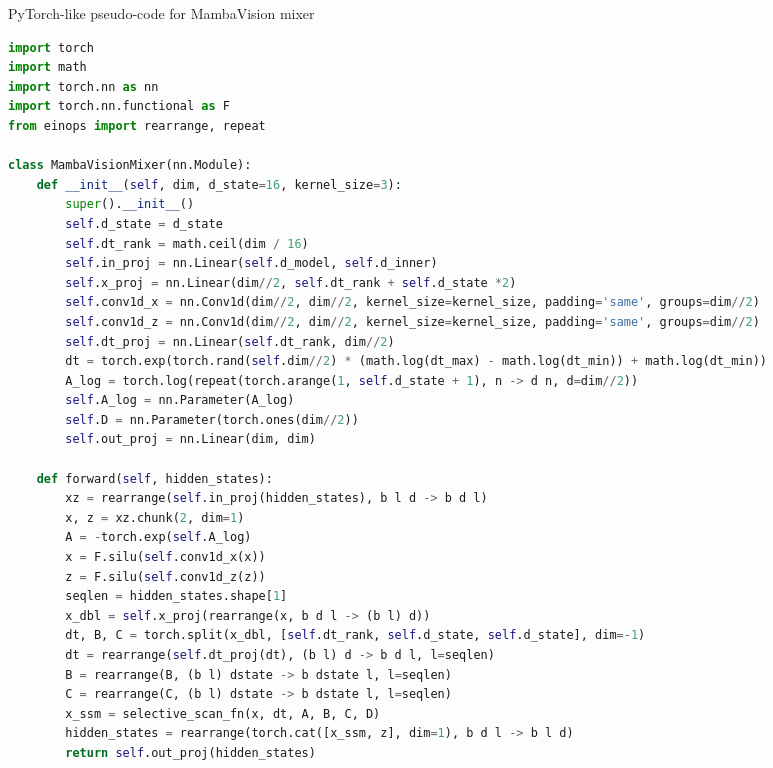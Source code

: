 \documentclass[10pt,twocolumn,letterpaper]{article}
\begin{document}
\begin{algorithm*}[t]
\caption{PyTorch-like pseudo-code for MambaVision mixer}
\label{alg:mamba_vision_mixer}
\begin{lstlisting}[language=python]
import torch
import math
import torch.nn as nn
import torch.nn.functional as F
from einops import rearrange, repeat

class MambaVisionMixer(nn.Module):
    def __init__(self, dim, d_state=16, kernel_size=3):
        super().__init__()
        self.d_state = d_state
        self.dt_rank = math.ceil(dim / 16)
        self.in_proj = nn.Linear(self.d_model, self.d_inner)
        self.x_proj = nn.Linear(dim//2, self.dt_rank + self.d_state *2)
        self.conv1d_x = nn.Conv1d(dim//2, dim//2, kernel_size=kernel_size, padding='same', groups=dim//2)
        self.conv1d_z = nn.Conv1d(dim//2, dim//2, kernel_size=kernel_size, padding='same', groups=dim//2)
        self.dt_proj = nn.Linear(self.dt_rank, dim//2)
        dt = torch.exp(torch.rand(self.dim//2) * (math.log(dt_max) - math.log(dt_min)) + math.log(dt_min))
        A_log = torch.log(repeat(torch.arange(1, self.d_state + 1), n -> d n, d=dim//2))
        self.A_log = nn.Parameter(A_log)
        self.D = nn.Parameter(torch.ones(dim//2))
        self.out_proj = nn.Linear(dim, dim)

    def forward(self, hidden_states):
        xz = rearrange(self.in_proj(hidden_states), b l d -> b d l)
        x, z = xz.chunk(2, dim=1)
        A = -torch.exp(self.A_log)
        x = F.silu(self.conv1d_x(x))
        z = F.silu(self.conv1d_z(z))
        seqlen = hidden_states.shape[1]
        x_dbl = self.x_proj(rearrange(x, b d l -> (b l) d))
        dt, B, C = torch.split(x_dbl, [self.dt_rank, self.d_state, self.d_state], dim=-1)
        dt = rearrange(self.dt_proj(dt), (b l) d -> b d l, l=seqlen)
        B = rearrange(B, (b l) dstate -> b dstate l, l=seqlen)
        C = rearrange(C, (b l) dstate -> b dstate l, l=seqlen)
        x_ssm = selective_scan_fn(x, dt, A, B, C, D)
        hidden_states = rearrange(torch.cat([x_ssm, z], dim=1), b d l -> b l d)
        return self.out_proj(hidden_states)
\end{lstlisting}
\end{algorithm*}
\end{document}
